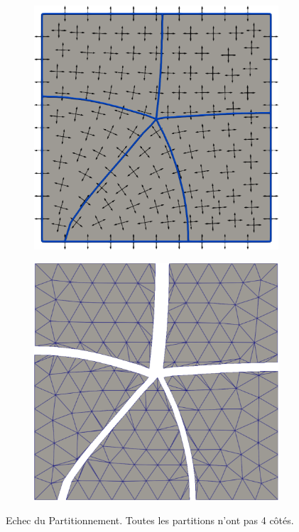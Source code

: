 \begin{figure}[h!]
\centering
\begin{subfigure}{0.49\textwidth}
    \includegraphics[width=\textwidth]{images/echec_partitionnement_1.pdf}
\end{subfigure}
\hfill
\begin{subfigure}{0.49\textwidth}
    \includegraphics[width=\textwidth]{images/echec_partitionnement_2.pdf}
\end{subfigure}
\caption{Echec du Partitionnement. Toutes les partitions n'ont pas 4 côtés.}
\label{fig:echec_partitionnement}
\end{figure}

